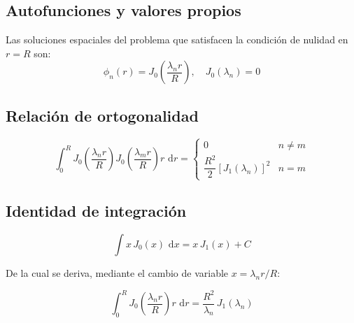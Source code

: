 \documentclass[12pt, a4paper]{article}
\newcommand{\dd}{\,\mathrm{d}}
\begin{document}
\subsection{Autofunciones y valores propios}

Las soluciones espaciales del problema que satisfacen la condición de nulidad en $r = R$ son:
\[
  \phi_n(r) = J_0\!\left(\frac{\lambda_n r}{R}\right), \quad J_0(\lambda_n) = 0
\]

\subsection{Relación de ortogonalidad}

\begin{equation}
  \int_0^R J_0\!\left(\frac{\lambda_n r}{R}\right) J_0\!\left(\frac{\lambda_m r}{R}\right) r\,\dd r
  =
  \begin{cases}
    0 & n \neq m \\[4pt]
    \dfrac{R^2}{2}\left[J_1(\lambda_n)\right]^2 & n = m
  \end{cases}
\end{equation}

\subsection{Identidad de integración}

\begin{equation}
  \int x\,J_0(x)\,\dd x = x\,J_1(x) + C
\end{equation}

De la cual se deriva, mediante el cambio de variable $x = \lambda_n r/R$:

\begin{equation}
  \int_0^R J_0\!\left(\frac{\lambda_n r}{R}\right) r\,\dd r = \frac{R^2}{\lambda_n}\,J_1(\lambda_n)
\end{equation}
\end{document}

